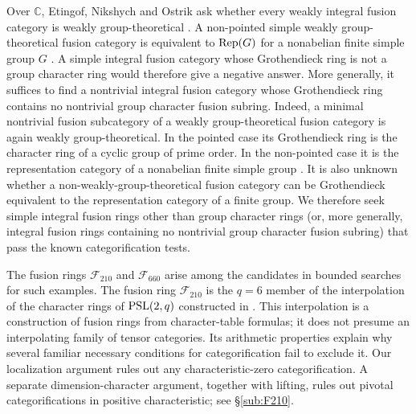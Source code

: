 \documentclass{amsart}
\begin{document}
Over $\mathbb C$, Etingof, Nikshych and Ostrik ask whether every weakly integral fusion category is weakly group-theoretical \cite[Question~2]{ENO11}. A non-pointed simple weakly group-theoretical fusion category is equivalent to $\mathrm{Rep}(G)$ for a nonabelian finite simple group $G$ \cite[Proposition~9.11]{ENO11}. A simple integral fusion category whose Grothendieck ring is not a group character ring would therefore give a negative answer. More generally, it suffices to find a nontrivial integral fusion category whose Grothendieck ring contains no nontrivial group character fusion subring. Indeed, a minimal nontrivial fusion subcategory of a weakly group-theoretical fusion category is again weakly group-theoretical. In the pointed case its Grothendieck ring is the character ring of a cyclic group of prime order. In the non-pointed case it is the representation category of a nonabelian finite simple group \cite[Propositions~4.1 and~9.11]{ENO11}. It is also unknown whether a non-weakly-group-theoretical fusion category can be Grothendieck equivalent to the representation category of a finite group. We therefore seek simple integral fusion rings other than group character rings (or, more generally, integral fusion rings containing no nontrivial group character fusion subring) that pass the known categorification tests.

The fusion rings $\mathcal F_{210}$ and $\mathcal F_{660}$ arise among the candidates in bounded searches for such examples. The fusion ring $\mathcal F_{210}$ is the $q=6$ member of the interpolation of the character rings of $\mathrm{PSL}(2,q)$ constructed in \cite{LPRinter}. This interpolation is a construction of fusion rings from character-table formulas; it does not presume an interpolating family of tensor categories. Its arithmetic properties explain why several familiar necessary conditions for categorification fail to exclude it. Our localization argument rules out any characteristic-zero categorification. A separate dimension-character argument, together with lifting, rules out pivotal categorifications in positive characteristic; see \S\ref{sub:F210}.
\end{document}
